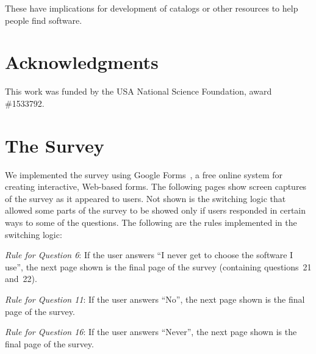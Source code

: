 \documentclass{casicswhitepaper}
\begin{document}
These have implications for development of catalogs or other resources to help people find software.  




\section{Acknowledgments}

This work was funded by the USA National Science Foundation, award \#1533792.  


\appendix
\section{The Survey}
\label{apdx:survey}

We implemented the survey using Google Forms~\cite{googleforms}, a free online system for creating interactive, Web-based forms.  The following pages show screen captures of the survey as it appeared to users.  Not shown is the switching logic that allowed some parts of the survey to be showed only if users responded in certain ways to some of the questions.  The following are the rules implemented in the switching logic:
\begin{description}

\item \emph{Rule for Question 6}: If the user answers ``I never get to choose the software I use'', the next page shown is the final page of the survey (containing questions~21 and~22).

\item  \emph{Rule for Question 11}: If the user answers ``No'', the next page shown is the final page of the survey.

\item \emph{Rule for Question 16}:  If the user answers ``Never'', the next page shown is the final page of the survey.

\end{description}


\clearpage




\clearpage


\end{document}
